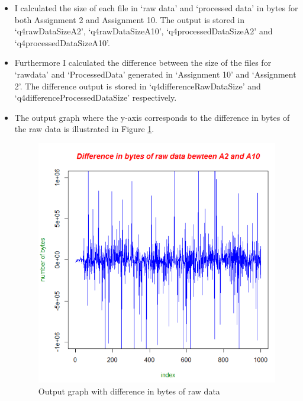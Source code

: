 \begin{itemize}
lynx -dump -force\textunderscore html $<$URI$>$ $>$ $<$ output filename $>$.\\
I named the files with the URI index followed by a hyphen and the word `processed'. This code is listed in Listing \ref{lst:q4code3}
\item I calculated the size of each file in `raw data' and `processed data' in bytes for both Assignment 2 and Assignment 10. The output is stored in `q4rawDataSizeA2', `q4rawDataSizeA10', `q4processedDataSizeA2' and `q4processedDataSizeA10'.
\item Furthermore I calculated the difference between the size of the files for `rawdata' and `ProcessedData' generated in `Assignment 10' and `Assignment 2'. The difference output is stored in `q4differenceRawDataSize' and `q4differenceProcessedDataSize' respectively.
\newpage
\item The output graph where the y-axis corresponds to the difference in bytes of the raw data is illustrated in Figure \ref{fig:q4fig1}. 
\begin{figure}[h!]
\begin{center}
\hspace*{-3cm} 
\includegraphics[scale=0.55, keepaspectratio=true]{figures/q4.PNG}
\caption{Output graph with difference in bytes of raw data}
\label{fig:q4fig1}
\end{center}

\end{figure}
\end{itemize}
